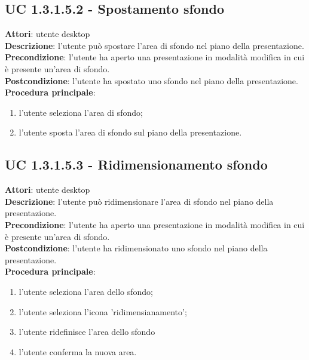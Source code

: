 \subsection{UC 1.3.1.5.2 - Spostamento sfondo}{
	\label{uc1.3.1.5.2}
	\textbf{Attori}: utente desktop \\
	\textbf{Descrizione}: l'utente può spostare l'area di sfondo nel piano della presentazione. \\
	\textbf{Precondizione}: l'utente ha aperto una presentazione in modalità modifica in cui è presente un'area di sfondo.	\\
	\textbf{Postcondizione}: l'utente ha spostato uno sfondo nel piano della presentazione.	\\
	\textbf{Procedura principale}:
	\begin{enumerate}
		\item l'utente seleziona l'area di sfondo;
		\item l'utente sposta l'area di sfondo sul piano della presentazione.
	\end{enumerate}
}
\subsection{UC 1.3.1.5.3 - Ridimensionamento sfondo}{
	\label{uc1.3.1.5.3}
	\textbf{Attori}: utente desktop \\
	\textbf{Descrizione}: l'utente può ridimensionare l'area di sfondo nel piano della presentazione. \\
	\textbf{Precondizione}: l'utente ha aperto una presentazione in modalità modifica in cui è presente un'area di sfondo.	\\
	\textbf{Postcondizione}: l'utente ha ridimensionato uno sfondo nel piano della presentazione.	\\
	\textbf{Procedura principale}:
	\begin{enumerate}
		\item l'utente seleziona l'area dello sfondo;
		\item l'utente seleziona l'icona 'ridimensianamento';
		\item l'utente ridefinisce l'area dello sfondo
		\item l'utente conferma la nuova area.
	\end{enumerate}
}
